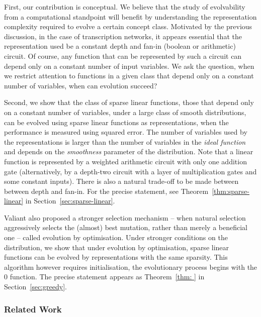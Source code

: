 First, our contribution is conceptual. We believe that the study of evolvability from
a computational standpoint will benefit by understanding the representation
complexity required to evolve a certain concept class. Motivated by the previous
discussion, in the case of transcription networks, it appears essential that the
representation used be a constant depth and fan-in (boolean or arithmetic)
circuit. Of course, any function that can be represented by such a circuit can
depend only on a constant number of input variables. We ask the
question, when we restrict attention to functions in a given class that depend
only on a constant number of variables, when can evolution succeed?

Second, we show that the class of sparse linear functions, those that depend
only on a constant number of variables, under a large class of smooth
distributions, can be evolved using sparse linear functions as representations,
when the performance is measured using squared error. The number of variables
used by the representations is larger than the number of variables in the
\emph{ideal function} and depends on the \emph{smoothness} parameter of the
distribution.  Note that a linear function is represented by a weighted
arithmetic circuit with only one addition gate (alternatively, by a depth-two
circuit with a layer of multiplication gates and some constant inputs). There
is also a natural trade-off to be made between between depth and fan-in. For the
precise statement, see Theorem~\ref{thm:sparse-linear} in
Section~\ref{sec:sparse-linear}.

Valiant also proposed a stronger selection mechanism -- when natural selection
aggressively selects the (almost) best mutation, rather than merely a beneficial
one -- called evolution by optimisation.  Under stronger conditions on the
distribution, we show that under evolution by optimisation, sparse linear
functions can be evolved by representations with the same sparsity. This
algorithm however requires initialisation, \ie the evolutionary process
begins with the $0$ function. The precise statement appears as Theorem~\ref{thm:
} in Section~\ref{sec:greedy}.

\subsubsection*{Related Work}

